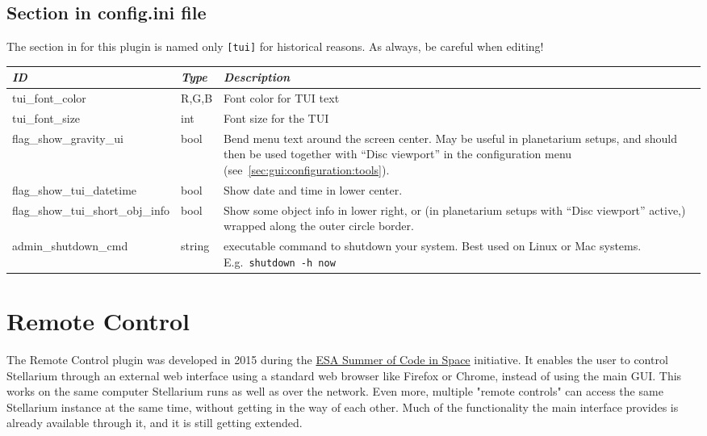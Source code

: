 \subsection{Section  in config.ini file}
\label{sec:plugins:TUI:config}

The section in  for this plugin is named only \texttt{[tui]} for historical reasons. As always, be careful when editing!

\begin{longtabu} to \textwidth {l|l|X}\toprule
\emph{ID}            & \emph{Type} & \emph{Description}\\\midrule
tui\_font\_color     & R,G,B & Font color for TUI text \\\midrule
tui\_font\_size      & int   & Font size for the TUI \\\midrule
flag\_show\_gravity\_ui           &bool&Bend menu text around the screen center. 
                                        May be useful in planetarium setups, and should then be used together with ``Disc viewport'' 
                                        in the configuration menu (see~\ref{sec:gui:configuration:tools}). \\\midrule
flag\_show\_tui\_datetime         &bool&Show date and time in lower center.\\\midrule
flag\_show\_tui\_short\_obj\_info &bool&Show some object info in lower right, or (in planetarium setups with ``Disc viewport'' active,) wrapped along the outer circle border. \\\midrule
admin\_shutdown\_cmd              &string& executable command to shutdown your system. Best used on Linux or Mac systems. E.g.\ \texttt{shutdown -h now}\\\bottomrule
\end{longtabu}



\newpage
\section{Remote Control}
\label{sec:plugin:RemoteControl}

The Remote Control plugin was developed in 2015 during the 
\href{http://sophia.estec.esa.int/socis/}{ESA Summer of Code in Space} 
initiative. It enables the user to control Stellarium through an external web 
interface using a standard web browser like Firefox or Chrome, instead of using 
the main GUI. This works on the same computer Stellarium runs as well as over 
the network. Even more, multiple "remote controls" can access the same 
Stellarium instance at the same time, without getting in the way of each other. 
Much of the functionality the main interface provides is already available 
through it, and it is still getting extended.

